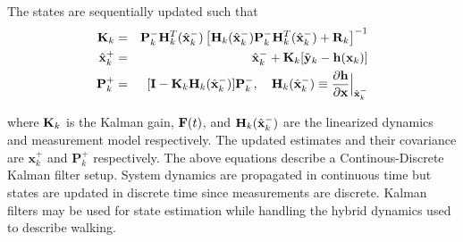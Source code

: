 \noindent The states are sequentially updated such that
\begin{eqnarray}
	\mathbf{K}_k &=& \mathbf{P}_k^- \mathbf{H}^T_k(\hat{\mathbf{x}}_k^-) \left[\mathbf{H}_k(\hat{\mathbf{x}}_k^-)\mathbf{P}_k^- \mathbf{H}^T_k(\hat{\mathbf{x}}_k^-) + \mathbf{R}_k\right]^{-1} \\
	\hat{\mathbf{x}}_k^+ &=& \hat{\mathbf{x}}_k^- + \mathbf{K}_k[\tilde{\mathbf{y}}_k-\mathbf{h}(\mathbf{x}_k)] \\
	\mathbf{P}_k^+ &=& [\mathbf{I} - \mathbf{K}_k \mathbf{H}_k(\hat{\mathbf{x}}_k^-)]\mathbf{P}_k^-,\quad \mathbf{H}_k(\hat{\mathbf{x}}_k^-) \equiv \frac{\partial \mathbf{h}}{\partial \mathbf{x}} \Bigr |_{\hat{\mathbf{x}}_k^-}
\end{eqnarray}

\noindent where $ \mathbf{K}_k $ is the Kalman gain, $ \mathbf{F}(t) $, and $ \mathbf{H}_k(\hat{\mathbf{x}}_k^-) $ are the linearized dynamics and measurement model respectively. The updated estimates and their covariance are $ \mathbf{x}_k^+ $ and $ \mathbf{P}_k^+ $ respectively. The above equations describe a Continous-Discrete Kalman filter setup. System dynamics are propagated in continuous time but states are updated in discrete time since measurements are discrete. Kalman filters may be used for state estimation while handling the hybrid dynamics used to describe walking.
